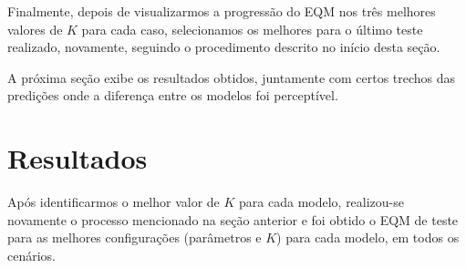 \documentclass[a4paper, 12pt]{article}
\begin{document}
Finalmente, depois de visualizarmos a progressão do EQM nos três melhores valores de $K$ para cada caso, selecionamos os melhores para o último teste realizado, novamente, seguindo o procedimento descrito no início desta seção.

A próxima seção exibe os resultados obtidos, juntamente com certos trechos das predições onde a diferença entre os modelos foi perceptível.

\section{Resultados}

Após identificarmos o melhor valor de $K$ para cada modelo, realizou-se novamente o processo mencionado na seção anterior e foi obtido o EQM de teste para as melhores configurações (parâmetros e $K$) para cada modelo, em todos os cenários. 
\end{document}
